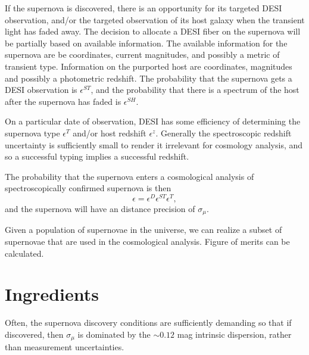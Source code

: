 \documentclass[onecolumn]{aastex61}   	%
\begin{document}
If the supernova is discovered, there is an opportunity for its targeted DESI observation, and/or the targeted
observation of its host galaxy when the transient light has faded away.  
The decision to allocate a DESI fiber on the supernova will be partially based on available information. The available
information for the supernova are be coordinates, current magnitudes, and possibly a metric of transient type.
Information on the purported host are coordinates, magnitudes and possibly a photometric redshift.  
The probability that the supernova gets a DESI observation is $\epsilon^{ST}$, and the probability that there is a  spectrum of the host
after the supernova has faded is $\epsilon^{SH}$.

On a particular date of observation,
DESI has some efficiency of determining the supernova type  $\epsilon^T$ and/or host redshift $\epsilon^z$. 
Generally the spectroscopic redshift uncertainty is sufficiently small to render it irrelevant
for cosmology analysis, and so a successful typing implies a successful redshift.

The probability that the supernova enters a cosmological analysis of spectroscopically confirmed supernova is then
\begin{equation}
\epsilon = \epsilon^D \epsilon^{ST} \epsilon^T,
\end{equation}
and the supernova will have an distance precision of $\sigma_\mu$.

Given a population of supernovae in the universe, we can realize a subset of supernovae that are used in the cosmological analysis.
Figure of merits can be calculated.

\section{Ingredients}




Often, the supernova discovery conditions are sufficiently demanding so that if discovered, then
$\sigma_\mu$ is
dominated by the $\sim 0.12$ mag intrinsic dispersion, rather than measurement uncertainties.
\end{document}
